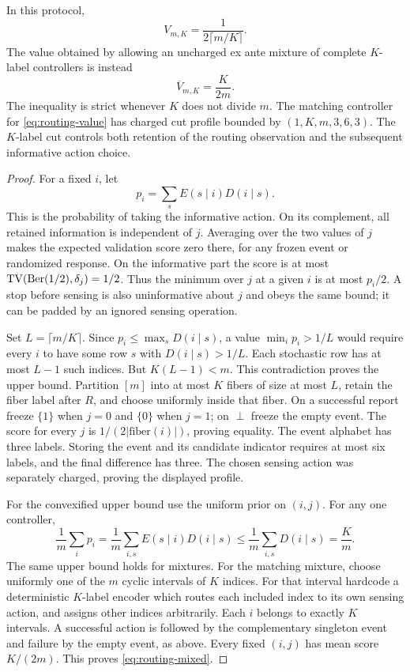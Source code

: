 \begin{theorem}
\label{thm:routing-gap}
In this protocol,
\begin{equation}\label{eq:routing-value}
 V_{m,K}=\frac{1}{2\lceil m/K\rceil}.
\end{equation}
The value obtained by allowing an uncharged ex ante mixture of complete
$K$-label controllers is instead
\begin{equation}\label{eq:routing-mixed}
                         \overline V_{m,K}=\frac{K}{2m}.
\end{equation}
The inequality is strict whenever $K$ does not divide $m$. The matching
controller for \eqref{eq:routing-value} has charged cut profile bounded
by $(1,K,m,3,6,3)$. The $K$-label cut controls both retention of the
routing observation and the subsequent informative action choice.
\end{theorem}
\begin{proof}
For a fixed $i$, let
\[
                         p_i=\sum_s E(s\mid i)D(i\mid s).
\]
This is the probability of taking the informative action. On its
complement, all retained information is independent of $j$. Averaging
over the two values of $j$ makes the expected validation score zero
there, for any frozen event or randomized response. On the informative
part the score is at most $\operatorname{TV}(\mathrm{Ber}(1/2),\delta_j)=1/2$.
Thus the minimum over $j$ at a given $i$ is at most $p_i/2$.
A stop before sensing is also uninformative about $j$ and obeys the
same bound; it can be padded by an ignored sensing operation.

Set $L=\lceil m/K\rceil$. Since $p_i\le\max_sD(i\mid s)$,
a value $\min_i p_i>1/L$ would require every $i$ to have some row $s$
with $D(i\mid s)>1/L$. Each stochastic row has at most $L-1$ such
indices. But $K(L-1)<m$. This contradiction proves the upper bound.
Partition $[m]$ into at most $K$ fibers of size at most $L$, retain the
fiber label after $R$, and choose uniformly inside that fiber. On a
successful report freeze $\{1\}$ when $j=0$ and $\{0\}$ when $j=1$;
on $\perp$ freeze the empty event. The score for every $j$ is
$1/(2|\text{fiber}(i)|)$, proving equality. The event alphabet has three
labels. Storing the event and its candidate indicator requires at most
six labels, and the final difference has three. The chosen sensing
action was separately charged, proving the displayed profile.

For the convexified upper bound use the uniform prior on $(i,j)$.
For any one controller,
\[
 \frac1m\sum_i p_i
    =\frac1m\sum_{i,s}E(s\mid i)D(i\mid s)
    \le\frac1m\sum_{i,s}D(i\mid s)=\frac Km.
\]
The same upper bound holds for mixtures. For the matching mixture,
choose uniformly one of the $m$ cyclic intervals of $K$ indices.
For that interval hardcode a deterministic $K$-label encoder which
routes each included index to its own sensing action, and assigns other
indices arbitrarily. Each $i$ belongs to exactly $K$ intervals. A
successful action is followed by the complementary singleton event and
failure by the empty event, as above. Every fixed $(i,j)$ has mean score
$K/(2m)$. This proves \eqref{eq:routing-mixed}.
\end{proof}

